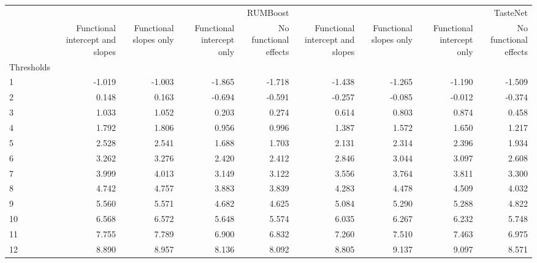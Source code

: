 \begin{tabular}{lrrrrrrrr}
\toprule
 & \multicolumn{4}{r}{RUMBoost} & \multicolumn{4}{r}{TasteNet} \\
 & Functional intercept and slopes & Functional slopes only & Functional intercept only & No functional effects & Functional intercept and slopes & Functional slopes only & Functional intercept only & No functional effects \\
Thresholds &  &  &  &  &  &  &  &  \\
\midrule
1 & -1.019 & -1.003 & -1.865 & -1.718 & -1.438 & -1.265 & -1.190 & -1.509 \\
2 & 0.148 & 0.163 & -0.694 & -0.591 & -0.257 & -0.085 & -0.012 & -0.374 \\
3 & 1.033 & 1.052 & 0.203 & 0.274 & 0.614 & 0.803 & 0.874 & 0.458 \\
4 & 1.792 & 1.806 & 0.956 & 0.996 & 1.387 & 1.572 & 1.650 & 1.217 \\
5 & 2.528 & 2.541 & 1.688 & 1.703 & 2.131 & 2.314 & 2.396 & 1.934 \\
6 & 3.262 & 3.276 & 2.420 & 2.412 & 2.846 & 3.044 & 3.097 & 2.608 \\
7 & 3.999 & 4.013 & 3.149 & 3.122 & 3.556 & 3.764 & 3.811 & 3.300 \\
8 & 4.742 & 4.757 & 3.883 & 3.839 & 4.283 & 4.478 & 4.509 & 4.032 \\
9 & 5.560 & 5.571 & 4.682 & 4.625 & 5.084 & 5.290 & 5.288 & 4.822 \\
10 & 6.568 & 6.572 & 5.648 & 5.574 & 6.035 & 6.267 & 6.232 & 5.748 \\
11 & 7.755 & 7.789 & 6.900 & 6.832 & 7.260 & 7.510 & 7.463 & 6.975 \\
12 & 8.890 & 8.957 & 8.136 & 8.092 & 8.805 & 9.137 & 9.097 & 8.571 \\
\bottomrule
\end{tabular}
